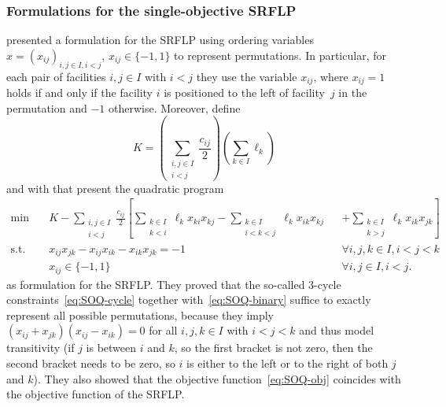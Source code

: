 \documentclass{article}
\newcommand{\SRFLP}{SRFLP\xspace}
\begin{document}
\subsubsection{Formulations for the single-objective \SRFLP}\label{sec:SRFLPForm}
\citet{anjos_semidefinite_2005} presented a formulation for
the \SRFLP using ordering variables $x = (x_{ij})_{i,j \in I, i < j}$, $x_{ij} \in \{-1, 1\}$ to represent permutations. In particular, for each pair of facilities $i,j \in I$ with $i<j$ they use the variable $x_{ij}$, where $x_{ij}=1$ holds if and only if the facility $i$ is positioned to the left of facility~$j$ in the permutation and $-1$ otherwise. 
Moreover, \citet{anjos_semidefinite_2005} define
\begin{equation}    
    K = \left(\sum_{\substack{i,j \in I \\ i < j}} \frac{c_{ij}}{2}\right)
    \left(\sum_{k\in I}\ell_k\right) \label{eq:const}
\end{equation}
and with that present the quadratic program
\begin{subequations}
\label{QP:SRFLP}
\begin{alignat}{3}
    \min \quad & K - \sum_{\substack{i,j \in I \\ i < j}} \frac{c_{ij}}{2}
    \left[\sum_{\substack{k \in I \\ k < i}}\ell_kx_{ki}x_{kj} - 
    \sum_{\substack{k \in I \\ i < k < j}}\ell_kx_{ik}x_{kj} \right.&&\left.+ 
    \sum_{\substack{k \in I \\ k > j}}\ell_kx_{ik}x_{jk}\right] \label{eq:SOQ-obj} \\
    \text{s.t.}\quad & x_{ij}x_{jk} - x_{ij}x_{ik} - x_{ik}x_{jk} = -1 
    && \forall i,j,k \in I, i < j < k \label{eq:SOQ-cycle}\\
    &x_{ij} \in \{-1, 1\} && \forall i,j \in I, i < j. 
    \label{eq:SOQ-binary}
\end{alignat}
\end{subequations}
as formulation for the \SRFLP. They proved that the so-called 
3-cycle constraints~\eqref{eq:SOQ-cycle} together with~\eqref{eq:SOQ-binary} suffice to exactly represent all possible permutations, because they imply $(x_{ij}+x_{jk})(x_{ij}-x_{ik}) = 0$ for all $i,j,k \in I$ with $i < j < k$ and thus model transitivity (if $j$ is between $i$ and $k$, so the first bracket is not zero, then the second bracket needs to be zero, so $i$ is either to the left or to the right of both $j$ and $k$).
They also showed that the objective function~\eqref{eq:SOQ-obj} coincides with the objective function of the \SRFLP. 
\end{document}

